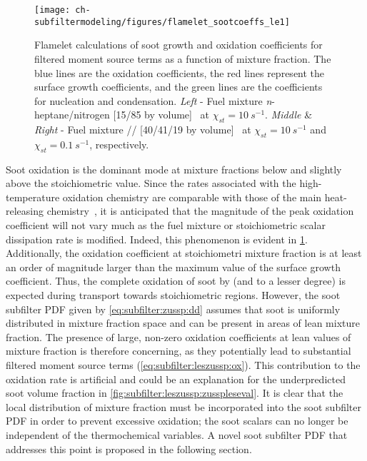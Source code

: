 \begin{figure}[htb]
  \begin{center}
    \texttt{[image: ch-subfiltermodeling/figures/flamelet\_sootcoeffs\_le1]}
    \caption[Soot Growth and Oxidation Coefficients, 1/\texorpdfstring{$\tau$}{t} vs. \texorpdfstring{$Z$}{Z}]{Flamelet calculations of soot growth and oxidation coefficients for filtered moment source terms as a function of mixture fraction. The blue lines are the oxidation coefficients, the red lines represent the surface growth coefficients, and the green lines are the coefficients for nucleation and condensation. \textit{Left} - Fuel mixture \textit{n}-heptane/nitrogen [15/85 by volume]~\cite{attili2014} at $\chi_{st} = 10\ s^{-1}$. \textit{Middle} \& \textit{Right} - Fuel mixture // [40/41/19 by volume]~\cite{mahmoud2017} at $\chi_{st} = 10\ s^{-1}$ and $\chi_{st} = 0.1\ s^{-1}$, respectively.}
    \label{fig:subfilter:leszussp:kvsz}
  \end{center}
\end{figure}

Soot oxidation is the dominant mode at mixture fractions below and slightly above the stoichiometric value. Since the rates associated with the high-temperature oxidation chemistry are comparable with those of the main heat-releasing chemistry~\cite{guo2016}, it is anticipated that the magnitude of the peak oxidation coefficient will not vary much as the fuel mixture or stoichiometric scalar dissipation rate is modified. Indeed, this phenomenon is evident in \cref{fig:subfilter:leszussp:kvsz}. Additionally, the oxidation coefficient at stoichiometri mixture fraction is at least an order of magnitude larger than the maximum value of the surface growth coefficient. Thus, the complete oxidation of soot by  (and  to a lesser degree) is expected during transport towards stoichiometric regions. However, the soot subfilter PDF given by \cref{eq:subfilter:zussp:dd} assumes that soot is uniformly distributed in mixture fraction space and can be present in areas of lean mixture fraction. The presence of large, non-zero oxidation coefficients at lean values of mixture fraction is therefore concerning, as they potentially lead to substantial filtered moment source terms (\cref{eq:subfilter:leszussp:ox}). This contribution to the oxidation rate is artificial and could be an explanation for the underpredicted soot volume fraction in \cref{fig:subfilter:leszussp:zusspleseval}. It is clear that the local distribution of mixture fraction must be incorporated into the soot subfilter PDF in order to prevent excessive oxidation; the soot scalars can no longer be independent of the thermochemical variables. A novel soot subfilter PDF that addresses this point is proposed in the following section.
